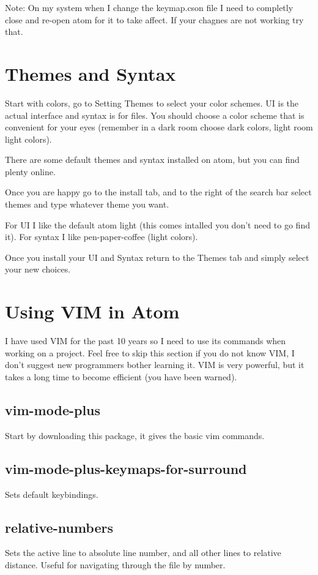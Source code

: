 \documentclass[preprint,showpacs,preprintnumbers,amsmath,amssymb]{revtex4}
\begin{document}
Note: On my system when I change the keymap.cson file I need to completly close
and re-open atom for it to take affect.
If your chagnes are not working try that.

\section{Themes and Syntax}
Start with colors, go to Setting Themes to select your color schemes.
UI is the actual interface and syntax is for files.
You should choose a color scheme that is convenient for your eyes (remember in
a dark room choose dark colors, light room light colors).

There are some default themes and syntax installed on atom, but you can find
plenty online.

Once you are happy go to the install tab, and to the right of the search bar
select themes and type whatever theme you want.

For UI I like the default atom light (this comes intalled you don't need to go
find it).
For syntax I like pen-paper-coffee (light colors).

Once you install your UI and Syntax return to the Themes tab and simply select
your new choices.

\section{Using VIM in Atom}
I have used VIM for the past 10 years so I need to use its commands when working
on a project.
Feel free to skip this section if you do not know VIM, I don't suggest new
programmers bother learning it.
VIM is very powerful, but it takes a long time to become efficient (you have
been warned).

\subsection{vim-mode-plus}
Start by downloading this package, it gives the basic vim commands.

\subsection{vim-mode-plus-keymaps-for-surround}
Sets default keybindings.

\subsection{relative-numbers}
Sets the active line to absolute line number, and all other lines to relative
distance.
Useful for navigating through the file by number.
\end{document}
